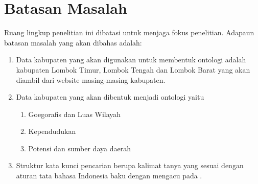 \section{Batasan Masalah}
Ruang lingkup penelitian ini dibatasi untuk menjaga fokus penelitian. Adapaun batasan masalah yang akan dibahas adalah:
\begin{enumerate}
	\item Data kabupaten yang akan digunakan untuk membentuk ontologi adalah kabupaten Lombok Timur, Lombok Tengah dan Lombok Barat yang akan diambil dari website masing-masing kabupaten.
	\item Data kabupaten yang akan dibentuk menjadi ontologi yaitu
	\begin{enumerate}
		\item Goegorafis dan Luas Wilayah
		\item Kependudukan 
		\item Potensi dan sumber daya daerah
	\end{enumerate}
	\item Struktur kata kunci pencarian berupa kalimat tanya yang sesuai dengan aturan tata bahasa Indonesia baku dengan mengacu pada \citet{alwi}.
\end{enumerate}
